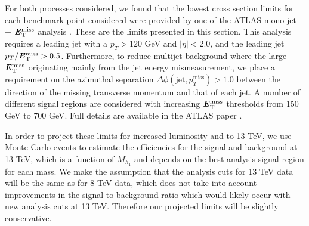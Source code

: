 For both processes considered, we found that the lowest cross section limits for each benchmark point considered were provided by one of the ATLAS mono-jet +
$\textbf{\textit{E}$_{\rm T}^{\rm miss}$}{}$ analysis \cite{Aad:2015zva}. These are the limits presented in this section. This analysis requires a leading jet with a $p_T > 120$ GeV and $|\eta|
<2.0$, and the leading jet $p_T/\textbf{\textit{E}$_{\rm T}^{\rm miss}$} > 0.5$. Furthermore, to reduce multijet background where the large $\textbf{\textit{E}$_{\rm T}^{\rm miss}$}{}$ originating mainly from the jet energy
mismeasurement, we place a requirement on the azimuthal separation $\Delta \phi (\text{jet},p_T^{\text{miss}}) > 1.0$ between the direction of the missing transverse momentum
and that of each jet. A number of different signal regions are considered with increasing $\textbf{\textit{E}$_{\rm T}^{\rm miss}$}{}$ thresholds from 150 GeV to 700 GeV. Full details are available in
the ATLAS paper \cite{Aad:2015zva}.

In order to project these limits for increased luminosity and to 13 TeV, we use Monte Carlo events to estimate the efficiencies for the signal and background at 13 TeV, which
is a function of $M_{h_1}$ and depends on the best analysis signal region for each mass. We make the assumption that the analysis cuts for 13 TeV data will be the same as for
8 TeV data, which does not take into account improvements in the signal to background ratio which would likely occur with new analysis cuts at 13 TeV. Therefore our projected
limits will be slightly conservative.

